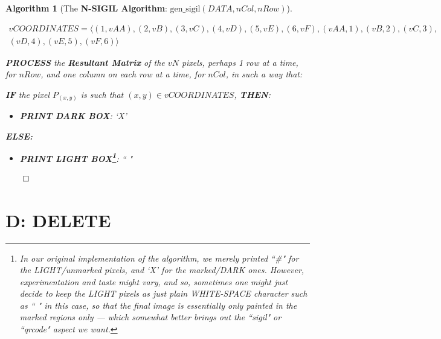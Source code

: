 \documentclass[a4paper, 18pt]{book} %
\newtheorem{alg}{Algorithm}
\begin{document}
\begin{alg}[The \textbf{N-SIGIL Algorithm}: $\text{gen\_sigil}(DATA, nCol, nRow)$]
\begin{enumerate}
{\begin{multline}
vCOORDINATES = \langle (1,vAA), (2,vB), (3,vC), (4,vD), (5,vE), (6,vF), (vAA,1), (vB,2), (vC,3),\\
 (vD,4), (vE,5), (vF,6) \rangle
\end{multline}

}

\item { \textbf{PROCESS} the \textbf{Resultant Matrix} of the $vN$ pixels, perhaps 1 row at a time, for $nRow$, and one column on each row at a time, for $nCol$, in such a way that:
\begin{itemize}
\item{ \textbf{IF} the pixel $P_{(x,y)}$ is such that $(x,y) \in vCOORDINATES$, \textbf{THEN}:
\begin{itemize}
\item \textbf{PRINT DARK BOX}: `X' 
\end{itemize}
\item{\textbf{ELSE:}
\begin{itemize}
\item \textbf{PRINT LIGHT BOX\footnote{In our original implementation of the algorithm, we merely printed ``\#" for the LIGHT/unmarked pixels, and `X' for the marked/DARK ones. However, experimentation and taste might vary, and so, sometimes one might just decide to keep the LIGHT pixels as just plain WHITE-SPACE character such as `` " in this case, so that the final image is essentially only painted in the marked regions only --- which somewhat better brings out the ``sigil" or ``qrcode" aspect we want.}}: `` " 
\end{itemize}
}
}
\end{itemize}

}
\end{enumerate}
$\qed$
\end{alg}
  
  
 
 
\chapter{D: DELETE}
\label{CHAPD}
\end{document}
